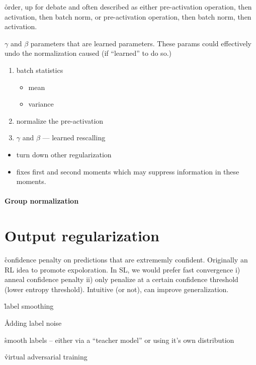 \r{order, up for debate and often described as either pre-activation operation, then activation, then batch norm, or pre-activation operation, then batch norm, then activation.}

\r{$\gamma$ and $\beta$ parameters that are learned parameters. These params could effectively undo the normalization caused (if ``learned'' to do so.)}


\begin{enumerate}[noitemsep,topsep=0pt]
	\item batch statistics
	\begin{itemize}[noitemsep,topsep=0pt]
		\item mean
		\item variance
	\end{itemize}
	\item normalize the pre-activation
	\item $\gamma$ and $\beta$ --- learned rescalling
\end{enumerate}




\begin{itemize}[noitemsep,topsep=0pt]
	\item turn down other regularization
	\item fixes first and second moments which may suppress information in these moments.
\end{itemize}



\paragraph{Group normalization}



\section{Output regularization}

\r{confidence penalty on predictions that are extrememly confident\cite{pereyra2017regularizing}. Originally an RL idea to promote expoloration. In SL, we would prefer fast convergence i) anneal confidence penalty ii) only penalize at a certain confidence threshold (lower entropy threshold). Intuitive (or not), can improve generalization.}

\r{label smoothing\cite{szegedy2016rethinking}}

\r{Adding label noise\cite{xie2016disturblabel}}

\r{smooth labels -- either via a ``teacher model''\cite{hinton2015distilling} or using it's own distribution\cite{reed2014training}}

\r{virtual adversarial training\cite{miyato2018virtual}}